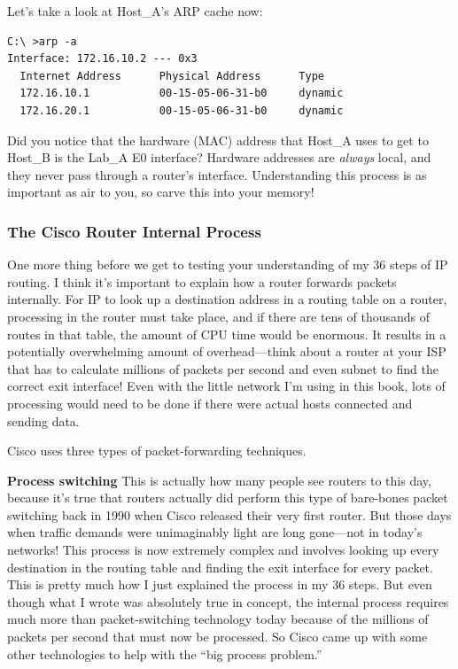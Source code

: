 Let's take a look at Host\_A's ARP cache now:

\begin{verbatim}
C:\ >arp -a
Interface: 172.16.10.2 --- 0x3
  Internet Address      Physical Address      Type
  172.16.10.1           00-15-05-06-31-b0     dynamic
  172.16.20.1           00-15-05-06-31-b0     dynamic
\end{verbatim}

Did you notice that the hardware (MAC) address that Host\_A uses to get
to Host\_B is the Lab\_A E0 interface? Hardware addresses are
\emph{always} local, and they never pass through a router's interface.
Understanding this process is as important as air to you, so carve this
into your memory!

\subsubsection[The Cisco Router Internal
Process]{\texorpdfstring{\protect\hypertarget{c09.xhtmlux5cux23c09-sec-3}{}{}The
Cisco Router Internal Process}{The Cisco Router Internal Process}}

One more thing before we get to testing your understanding of my 36
steps of IP routing. I think it's important to explain how a router
forwards packets internally. For IP to look up a
\protect\hypertarget{c09.xhtmlux5cux23Page_367}{}{}destination address
in a routing table on a router, processing in the router must take
place, and if there are tens of thousands of routes in that table, the
amount of CPU time would be enormous. It results in a potentially
overwhelming amount of overhead---think about a router at your ISP that
has to calculate millions of packets per second and even subnet to find
the correct exit interface! Even with the little network I'm using in
this book, lots of processing would need to be done if there were actual
hosts connected and sending data.

Cisco uses three types of packet-forwarding techniques.

\textbf{Process switching} This is actually how many people see routers
to this day, because it's true that routers actually did perform this
type of bare-bones packet switching back in 1990 when Cisco released
their very first router. But those days when traffic demands were
unimaginably light are long gone---not in today's networks! This process
is now extremely complex and involves looking up every destination in
the routing table and finding the exit interface for every packet. This
is pretty much how I just explained the process in my 36 steps. But even
though what I wrote was absolutely true in concept, the internal process
requires much more than packet-switching technology today because of the
millions of packets per second that must now be processed. So Cisco came
up with some other technologies to help with the ``big process
problem.''

